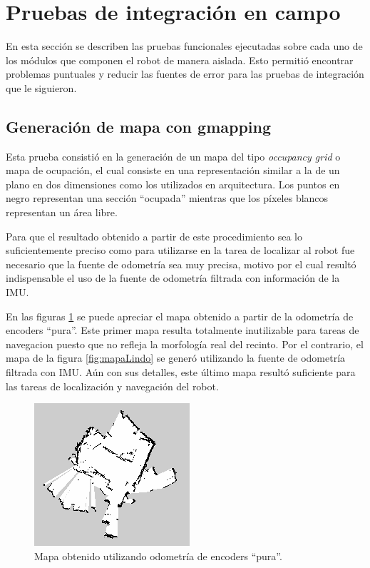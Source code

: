 \section{Pruebas de integración en campo}

En esta sección se describen las pruebas funcionales ejecutadas sobre cada uno de los módulos que componen el robot de manera aislada. Esto permitió encontrar problemas puntuales y reducir las fuentes de error para las pruebas de integración que le siguieron.

\subsection{Generación de mapa con gmapping}

Esta prueba consistió en la generación de un mapa del tipo \textit{occupancy grid} o mapa de ocupación, el cual consiste en una representación similar a la de un plano en dos dimensiones como los utilizados en arquitectura. Los puntos en negro representan una sección ``ocupada'' mientras que los píxeles blancos representan un área libre.


Para que el resultado obtenido a partir de este procedimiento sea lo suficientemente preciso como para utilizarse en la tarea de localizar al robot fue necesario que la fuente de odometría sea muy precisa, motivo por el cual resultó indispensable el uso de la fuente de odometría filtrada con información de la IMU.

En las figuras \ref{fig:mapaFeo} se puede apreciar el mapa obtenido a partir de la odometría de encoders ``pura''. Este primer mapa resulta totalmente inutilizable para tareas de navegacion puesto que no refleja la morfología real del recinto. Por el contrario, el mapa de la figura \ref{fig:mapaLindo} se generó utilizando la fuente de odometría filtrada con IMU. Aún con sus detalles, este último mapa resultó suficiente para las tareas de localización y navegación del robot.


\begin{figure}[ht]
    \centering
    \includegraphics[scale=1.0]{./Figures/mapa_feo.png}
    \caption{Mapa obtenido utilizando odometría de encoders ``pura''.}
    \label{fig:mapaFeo}
\end{figure}

